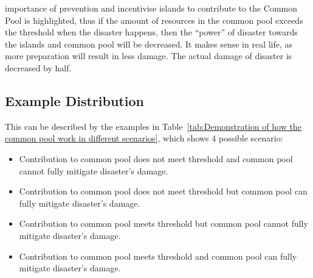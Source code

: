 importance of prevention and incentivise islands to contribute to the Common Pool is highlighted, thus if the amount of resources in the common pool exceeds the threshold when the disaster happens, then the “power” of disaster towards the islands and common pool will be decreased. It makes sense in real life, as more preparation will result in less damage. The actual damage of disaster is decreased by half.

\subsection{Example Distribution}
This can be described by the examples in Table~\ref{tab:Demonstration of how the common pool work in different scenarios}, which shows 4 possible scenario:

\begin{itemize}
    \item Contribution to common pool does not meet threshold and common pool cannot fully mitigate disaster’s damage.
    \item Contribution to common pool does not meet threshold but common pool can fully mitigate disaster’s damage.
    \item Contribution to common pool meets threshold but common pool cannot fully mitigate disaster’s damage.
    \item Contribution to common pool meets threshold and common pool can fully mitigate disaster’s damage.
\end{itemize}

